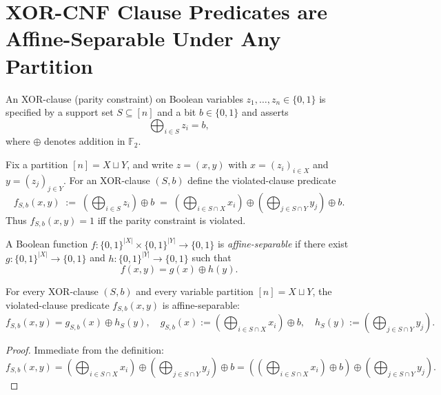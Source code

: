 \section{XOR-CNF Clause Predicates are Affine-Separable Under Any Partition}

\begin{definition}
An XOR-clause (parity constraint) on Boolean variables $z_1,\dots,z_n \in \{0,1\}$ is specified by a support set $S \subseteq [n]$ and a bit $b \in \{0,1\}$ and asserts
\[
\bigoplus_{i\in S} z_i = b,
\]
where $\oplus$ denotes addition in $\mathbb{F}_2$.
\end{definition}

\begin{definition}
Fix a partition $[n] = X \sqcup Y$, and write $z=(x,y)$ with $x=(z_i)_{i\in X}$ and $y=(z_j)_{j\in Y}$.
For an XOR-clause $(S,b)$ define the violated-clause predicate
\[
f_{S,b}(x,y)
\;:=\;
\left(\bigoplus_{i\in S} z_i\right)\oplus b
\;=\;
\left(\bigoplus_{i\in S\cap X} x_i\right)\oplus
\left(\bigoplus_{j\in S\cap Y} y_j\right)\oplus b.
\]
Thus $f_{S,b}(x,y)=1$ iff the parity constraint is violated.
\end{definition}

\begin{definition}
A Boolean function $f:\{0,1\}^{|X|}\times\{0,1\}^{|Y|}\to\{0,1\}$ is \emph{affine-separable} if there exist
$g:\{0,1\}^{|X|}\to\{0,1\}$ and $h:\{0,1\}^{|Y|}\to\{0,1\}$ such that
\[
f(x,y)=g(x)\oplus h(y).
\]
\end{definition}

\begin{lemma}\label{lem:xor_affine_separable}
For every XOR-clause $(S,b)$ and every variable partition $[n]=X\sqcup Y$, the violated-clause predicate $f_{S,b}(x,y)$ is affine-separable:
\[
f_{S,b}(x,y)=g_{S,b}(x)\oplus h_S(y),
\quad
g_{S,b}(x):=\left(\bigoplus_{i\in S\cap X} x_i\right)\oplus b,
\quad
h_S(y):=\left(\bigoplus_{j\in S\cap Y} y_j\right).
\]
\end{lemma}

\begin{proof}
Immediate from the definition:
\[
f_{S,b}(x,y)=\left(\bigoplus_{i\in S\cap X} x_i\right)\oplus
\left(\bigoplus_{j\in S\cap Y} y_j\right)\oplus b
=\left(\left(\bigoplus_{i\in S\cap X} x_i\right)\oplus b\right)\oplus
\left(\bigoplus_{j\in S\cap Y} y_j\right).
\]
\end{proof}

